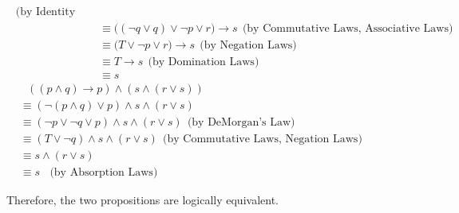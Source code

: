 \documentclass[a4paper,12pt]{article}
\begin{document}
\begin{spacing}{1.4}
\begin{align*}
        \ \ \text{(by Identity Laws)}\\
        &\equiv \big( (\neg q \vee q) \vee \neg p \vee r \big) 
        \rightarrow s
        \ \ \text{(by Commutative Laws, Associative Laws)}\\
        &\equiv \big( T \vee \neg p \vee r \big) 
        \rightarrow s
        \ \ \text{(by Negation Laws)}\\
        &\equiv T \rightarrow s 
        \ \ \text{(by Domination Laws)}\\
        &\equiv s
    \end{align*}
    \begin{align*}
    &\ \ \ ((p\wedge q) \rightarrow p)\wedge (s \wedge (r\vee s))\\
    &\equiv (\neg(p\wedge q)\vee p) \wedge s\wedge (r\vee s)\\
    &\equiv (\neg p \vee \neg q \vee p) \wedge s \wedge (r \vee s)
    \ \  \text{(by DeMorgan's Law)}\\
    &\equiv (T\vee \neg q) \wedge s \wedge (r\vee s)
    \ \ \text{(by Commutative Laws, Negation Laws)}
    \hspace{12em}\\ %
    &\equiv s\wedge (r\vee s)\\
    &\equiv s \ \ \ \ \text{(by Absorption Laws)}
    \end{align*}

    \setlength{\parindent}{0em}
    Therefore, the two propositions are logically equivalent.



    \end{spacing}
\end{document}
